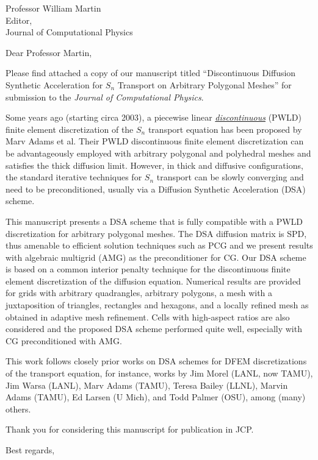 \begin{letter}{Professor William Martin\\
    Editor,\\
    Journal of Computational Physics}
\date{\today}

\opening{Dear Professor Martin,}
         \vspace{0.25cm}

Please find attached a copy of our manuscript titled ``Discontinuous Diffusion Synthetic Acceleration for $S_n$ Transport on
Arbitrary Polygonal Meshes'' for submission to the {\em Journal of Computational Physics}. 

Some years ago (starting circa 2003), a piecewise linear \underline{\it discontinuous}  (PWLD) finite element discretization of the $S_n$ transport equation has been proposed by Marv Adams et al. Their PWLD discontinuous finite element discretization can be advantageously employed with arbitrary polygonal and polyhedral meshes and satisfies the thick diffusion limit. However, in thick and diffusive configurations, the standard iterative techniques for $S_n$ transport can be slowly converging and need to be preconditioned, usually via a Diffusion Synthetic Acceleration (DSA) scheme.

This manuscript presents a DSA scheme that is fully compatible with a PWLD discretization for arbitrary polygonal meshes. The DSA diffusion matrix is SPD, thus amenable to efficient solution techniques such as PCG and we present results with algebraic multigrid (AMG) as the preconditioner for CG. Our DSA scheme is based on a common interior penalty technique for the discontinuous finite element discretization of the diffusion equation.  Numerical results are provided for grids with arbitrary quadrangles, arbitrary polygons, a mesh with a juxtaposition of triangles, rectangles and hexagons, and a locally refined mesh as obtained in adaptive mesh refinement. Cells with high-aspect ratios are also considered and the proposed DSA scheme performed quite well, especially with CG preconditioned with AMG.
 
This work follows closely prior works on DSA schemes for DFEM discretizations of the transport equation, for instance, works by Jim Morel (LANL, now TAMU), Jim Warsa (LANL), Marv Adams (TAMU), Teresa Bailey (LLNL), Marvin Adams (TAMU), Ed Larsen (U Mich), and Todd Palmer (OSU), among (many) others.



Thank you for considering this manuscript for publication in JCP.




\closing{Best regards, }

\end{letter}


